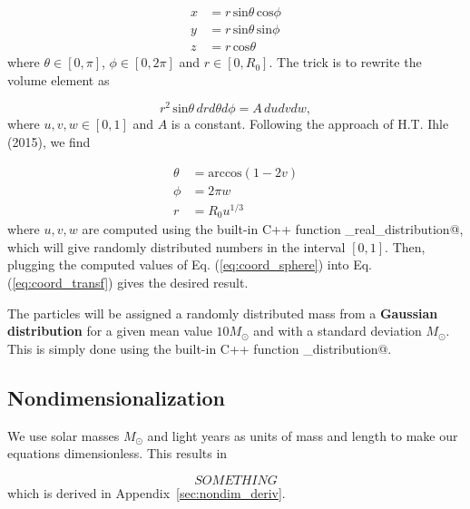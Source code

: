 \documentclass{article}
\begin{document}
\begin{multicols}{2}
\begin{equation}\label{eq:coord_transf}
\begin{aligned}
	x &= r \, \mathrm{sin}\theta \, \mathrm{cos}\phi \\
	y &= r \, \mathrm{sin}\theta \, \mathrm{sin}\phi \\
	z &= r \, \mathrm{cos}\theta
\end{aligned}
\end{equation}
where $\theta \in [0,\pi]$, $\phi \in [0,2\pi]$ and $r \in [0,R_0]$. The trick is to rewrite the volume element as

\begin{equation*}
	r^2 \, \mathrm{sin} \theta \, dr d\theta d\phi = A \, du dv dw,
\end{equation*}
where $u,v,w \in [0,1]$ and $A$ is a constant. Following the approach of H.T. Ihle (2015), we find 

\begin{equation}\label{eq:coord_sphere}
\begin{aligned}
	\theta &= \mathrm{arccos}(1 - 2v) \\
	\phi &= 2\pi w \\
	r &= R_0 u^{1/3}
\end{aligned}
\end{equation}
where $u,v,w$ are computed using the built-in C++ function \verb@uniform_real_distribution@, which will give randomly distributed numbers in the interval $[0,1]$. Then, plugging the computed values of Eq. (\ref{eq:coord_sphere}) into Eq. (\ref{eq:coord_transf}) gives the desired result. 

The particles will be assigned a randomly distributed mass from a \textbf{Gaussian distribution} for a given mean value $10 M_{\odot}$ and with a standard deviation $M_{\odot}$. This is simply done using the built-in C++ function \verb@normal_distribution@.  



\subsection{Nondimensionalization}\label{sec:nondim}
We use solar masses $M_{\odot}$ and light years as units of mass and length to make our equations dimensionless. This results in

\begin{equation}
	SOMETHING
\end{equation}
which is derived in Appendix~\ref{sec:nondim_deriv}.




\end{multicols}
\end{document}

